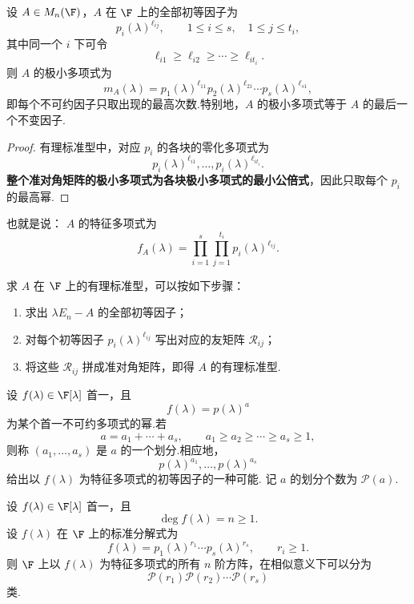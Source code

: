 \begin{corollary}
	设 $A\in M_n(\F)$，$A$ 在 $\F$ 上的全部初等因子为
	\[
	p_i(\lambda)^{\ell_{ij}},
	\qquad
	1\leq i\leq s,\quad 1\leq j\leq t_i,
	\]
	其中同一个 $i$ 下可令
	\[
	\ell_{i1}\geq\ell_{i2}\geq\cdots\geq\ell_{it_i}.
	\]
	则 $A$ 的极小多项式为
	\[
	m_A(\lambda)
	=
	p_1(\lambda)^{\ell_{11}}
	p_2(\lambda)^{\ell_{21}}
	\cdots
	p_s(\lambda)^{\ell_{s1}},
	\]
	即每个不可约因子只取出现的最高次数.特别地，$A$ 的极小多项式等于 $A$ 的最后一个不变因子.
\end{corollary}

\begin{proof}
	有理标准型中，对应 $p_i$ 的各块的零化多项式为
	\[
	p_i(\lambda)^{\ell_{i1}},\ldots,p_i(\lambda)^{\ell_{it_i}}.
	\]
	\textbf{整个准对角矩阵的极小多项式为各块极小多项式的最小公倍式}，因此只取每个 $p_i$ 的最高幂.
\end{proof}
也就是说：
	$A$ 的特征多项式为
	\[
	f_A(\lambda)
	=
	\prod_{i=1}^{s}\prod_{j=1}^{t_i}
	p_i(\lambda)^{\ell_{ij}}.
	\]

\begin{algo}
	求 $A$ 在 $\F$ 上的有理标准型，可以按如下步骤：
	\begin{enumerate}
		\item 求出 $\lambda E_n-A$ 的全部初等因子；
		\item 对每个初等因子 $p_i(\lambda)^{\ell_{ij}}$ 写出对应的友矩阵 $\mathcal{R}_{ij}$；
		\item 将这些 $\mathcal{R}_{ij}$ 拼成准对角矩阵，即得 $A$ 的有理标准型.
	\end{enumerate}
\end{algo}

	

	设 $f(\lambda)\in\F[\lambda]$ 首一，且
	\[
	f(\lambda)=p(\lambda)^a
	\]
	为某个首一不可约多项式的幂.若
	\[
	a=a_1+\cdots+a_s,\qquad
	a_1\geq a_2\geq\cdots\geq a_s\geq1,
	\]
	则称 $(a_1,\ldots,a_s)$ 是 $a$ 的一个划分.相应地，
	\[
	p(\lambda)^{a_1},\ldots,p(\lambda)^{a_s}
	\]
	给出以 $f(\lambda)$ 为特征多项式的初等因子的一种可能.
	记 $a$ 的划分个数为 $\mathcal{P}(a)$.
\begin{proposition}
		设 $f(\lambda)\in\F[\lambda]$ 首一，且
	\[
	\deg f(\lambda)=n\geq1.
	\]
	设 $f(\lambda)$ 在 $\F$ 上的标准分解式为
	\[
	f(\lambda)=p_1(\lambda)^{r_1}\cdots p_s(\lambda)^{r_s},
	\qquad r_i\geq1.
	\]
	则 $\F$ 上以 $f(\lambda)$ 为特征多项式的所有 $n$ 阶方阵，在相似意义下可以分为
	\[
	\mathcal{P}(r_1)\mathcal{P}(r_2)\cdots \mathcal{P}(r_s)
	\]
	类.
\end{proposition}

